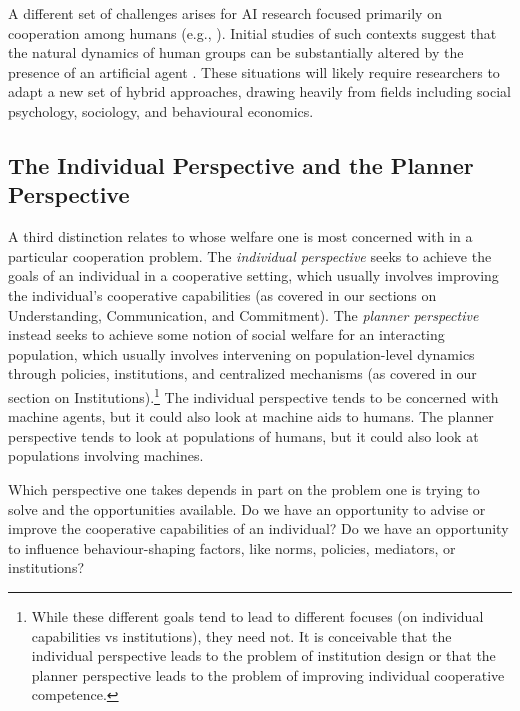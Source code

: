 \documentclass[11pt, a4paper, logo, onecolumn, nonumbering]{deepmind}
\begin{document}
A different set of challenges arises for AI research focused primarily on cooperation among humans (e.g., \cite{zheng2020ai}). Initial studies of such contexts suggest that the natural dynamics of human groups can be substantially altered by the presence of an artificial agent \cite{shirado2017locally, traeger2020vulnerable}. These situations will likely require researchers to adapt a new set of hybrid approaches, drawing heavily from fields including social psychology, sociology, and behavioural economics.

\subsection{The Individual Perspective and the Planner Perspective}

A third distinction relates to whose welfare one is most concerned with in a particular cooperation problem.  The \textit{individual perspective} seeks to achieve the goals of an individual in a cooperative setting, which usually involves improving the individual's cooperative capabilities (as covered in our sections on Understanding, Communication, and Commitment). The \textit{planner perspective} instead seeks to achieve some notion of social welfare for an interacting population, which usually involves intervening on population-level dynamics through policies, institutions, and centralized mechanisms (as covered in our section on Institutions).\footnote{While these different goals tend to lead to different focuses (on individual capabilities vs institutions), they need not. It is conceivable that the individual perspective leads to the problem of institution design or that the planner perspective leads to the problem of improving individual cooperative competence.} The individual perspective tends to be concerned with machine agents, but it could also look at machine aids to humans. The planner perspective tends to look at populations of humans, but it could also look at populations involving machines. 

Which perspective one takes depends in part on the problem one is trying to solve and the opportunities available. Do we have an opportunity to advise or improve the cooperative capabilities of an individual? Do we have an opportunity to influence behaviour-shaping factors, like norms, policies, mediators, or institutions? 
\end{document}
